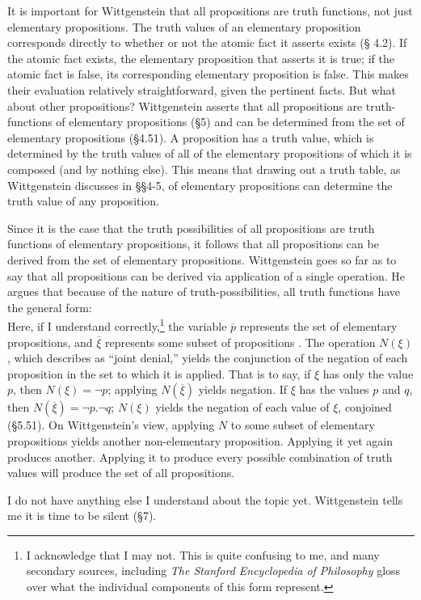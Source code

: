 \documentclass[man,12pt,natbib]{apa6}
\begin{document}
It is important for Wittgenstein that all propositions are truth functions, not
just elementary propositions. The truth values of an elementary proposition
corresponds directly to whether or not the atomic fact it asserts exists (\S
4.2). If the atomic fact exists, the elementary proposition that asserts it is
true; if the atomic fact is false, its corresponding elementary proposition is
false. This makes their evaluation relatively straightforward, given the
pertinent facts. But what about other propositions? Wittgenstein asserts that
all propositions are truth-functions of elementary propositions (\S 5) and can
be determined from the set of elementary propositions (\S 4.51). A proposition
has a truth value, which is determined by the truth values of all of the
elementary propositions of which it is composed (and by nothing else). This
means that drawing out a truth table, as Wittgenstein discusses in \S\S 4-5, of
elementary propositions can determine the truth value of any proposition.

Since it is the case that the truth possibilities of all propositions are truth
functions of elementary propositions, it follows that all propositions can be
derived from the set of elementary propositions. Wittgenstein goes so far as to
say that all propositions can be derived via application of a single operation.
He argues that because of the nature of truth-possibilities, all truth
functions have the general form: 
\begin{equation}
	[ \overline{p}, \overline{\xi}, N(\overline{\xi}) ]
\end{equation}
Here, if I understand correctly,\footnote{I acknowledge that I may not. This is
quite confusing to me, and many secondary sources, including \emph{The Stanford
Encyclopedia of Philosophy} gloss over what the individual components of this
form represent.} the variable $ \overline{p} $ represents the set of elementary
propositions, and $ \overline{\xi} $ represents some subset of propositions
\cite{Speaks07}. The operation $ N( \xi ) $, which \citet{Geach81} describes as
``joint denial,'' yields the conjunction of the negation of each proposition in
the set to which it is applied. That is to say, if $\xi$ has only the value
$p$, then $N(\xi) = \neg p$; applying $N(\overline{\xi})$ yields negation. If
$\xi$ has the values $p$ and $q$, then $N(\overline{\xi}) = \neg p. \neg q$;
$N(\xi)$ yields the negation of each value of $\xi$, conjoined (\S 5.51). On
Wittgenstein's view, applying $N$ to some subset of elementary propositions
yields another non-elementary proposition. Applying it yet again produces
another. Applying it to produce every possible combination of truth values will
produce the set of all propositions.

I do not have anything else I understand about the topic yet. Wittgenstein
tells me it is time to be silent (\S 7).

\clearpage


\end{document}

